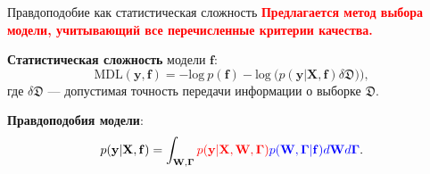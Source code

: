 \documentclass[usenames,dvipsnames,11pt,pdf,utf8,russian,aspectratio=169]{beamer}
\begin{document}
\begin{frame}{Правдоподобие как статистическая сложность}  
\small
\textcolor{red}{\textbf{Предлагается метод выбора модели, учитывающий все перечисленные критерии качества. }}

\textbf{Статистическая сложность} модели $\mathbf{f}$:
\[
	\text{MDL}(\mathbf{y},\mathbf{f}) = -\text{log}~p(\mathbf{f}) - \text{log}~\bigl(p(\mathbf{y}|\mathbf{X}, \mathbf{f})\delta\mathfrak{D})\bigr),
\]
где $\delta\mathfrak{D}$ --- допустимая точность передачи информации о выборке $\mathfrak{D}$.

\textbf{Правдоподобия модели}:                                      
\[                                                                                                                                              
        p(\mathbf{y}|\mathbf{X}, \mathbf{f}) = \int_{\mathbf{W}, \boldsymbol{\Gamma} } \textcolor{red}{p(\mathbf{y}|\mathbf{X},\mathbf{W},  \boldsymbol{\Gamma})} \textcolor{blue}{p(\mathbf{W}, \boldsymbol{\Gamma}| \mathbf{f}) d\mathbf{W}d{\boldsymbol{\Gamma}}}.                         
\]       


\begin{figure}
\vspace{-0.5cm}
  \centering

\end{figure}
\end{frame}
\end{document}
